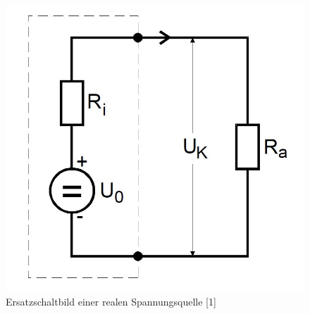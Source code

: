 	\begin{figure}[h]
		\begin{center}
		\includegraphics[scale=0.3]{pic1.jpg}
		\caption{Ersatzschaltbild einer realen Spannungsquelle [1]}
		\label{pic1}
		\end{center}	
	\end{figure}